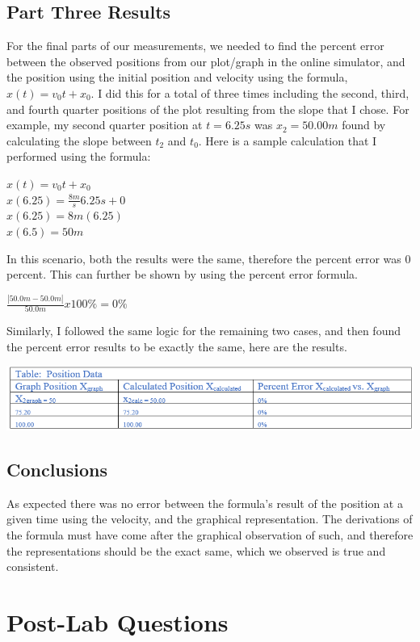 \documentclass{article}
\begin{document}
\subsection{Part Three Results} 
For the final parts of our measurements, we needed to find the percent error between the observed positions from our plot/graph in the online simulator, and the position using the initial position and velocity using the formula, \(x(t) = v_0t + x_0\). I did this for a total of three times including the second, third, and fourth quarter positions of the plot resulting from the slope that I chose. For example, my second quarter position at \(t=6.25s\) was \(x_2=50.00m\) found by calculating the slope between \(t_2\) and \(t_0\). Here is a sample calculation that I performed using the formula: 
\begin{center} 
\(x(t) = v_0t+x_0\) \\ 
\(x(6.25) = \frac{8m}{s}6.25s + 0\) \\
\(x(6.25) = 8m(6.25)\) \\
\(x(6.5) = 50m\) \\
\end{center} 
In this scenario, both the results were the same, therefore the percent error was 0 percent. This can further be shown by using the percent error formula.
\begin{center}
\(\frac{|50.0m-50.0m|}{50.0m} x 100\% = 0\%\)
\end{center}
Similarly, I followed the same logic for the remaining two cases, and then found the percent error results to be exactly the same, here are the results. 
\begin{center}
    \includegraphics[scale=0.7]{data3.PNG}
\end{center}
\subsection{Conclusions} 
As expected there was no error between the formula's result of the position at a given time using the velocity, and the graphical representation. The derivations of the formula must have come after the graphical observation of such, and therefore the representations should be the exact same, which we observed is true and consistent. 
\section{Post-Lab Questions} 
\end{document}
